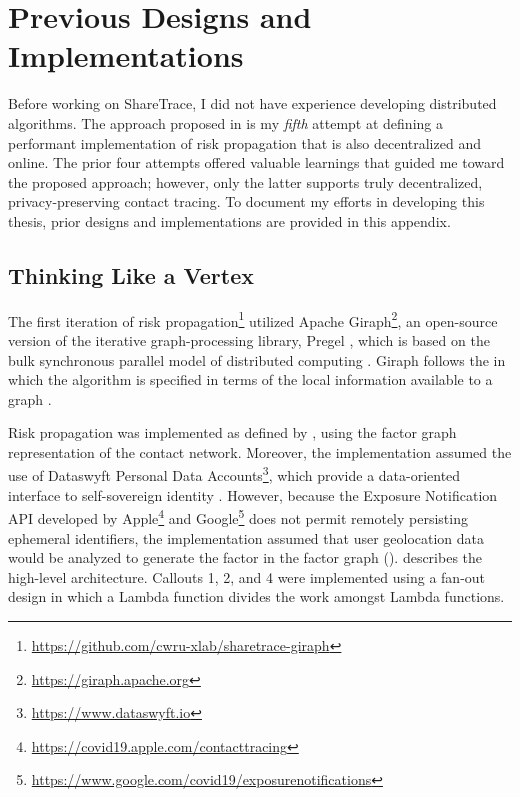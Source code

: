 \chapter{Previous Designs and Implementations}\label{sec:previous-designs}


Before working on ShareTrace, I did not have experience developing distributed algorithms. The approach proposed in  is my \emph{fifth} attempt at defining a performant implementation of risk propagation that is also decentralized and online. The prior four attempts offered valuable learnings that guided me toward the proposed approach; however, only the latter supports truly decentralized, privacy-preserving contact tracing. To document my efforts in developing this thesis, prior designs and implementations are provided in this appendix.

\section{Thinking Like a Vertex}\label{sec:giraph}

The first iteration of risk propagation\footnote{\url{https://github.com/cwru-xlab/sharetrace-giraph}} utilized Apache Giraph\footnote{\url{https://giraph.apache.org}}, an open-source version of the iterative graph-processing library, Pregel \citep{Malewicz2010}, which is based on the bulk synchronous parallel model of distributed computing \citep{Valiant1990}. Giraph follows the  in which the algorithm is specified in terms of the local information available to a graph \vertexName{} \citep{McCune2015}.

Risk propagation was implemented as defined by \citet{Ayday2020,Ayday2021}, using the factor graph representation of the contact network. Moreover, the implementation assumed the use of Dataswyft Personal Data Accounts\footnote{\url{https://www.dataswyft.io}}, which provide a data-oriented interface to self-sovereign identity \citep[pp. 98--99]{Preukschat2021}. However, because the Exposure Notification API developed by Apple\footnote{\url{https://covid19.apple.com/contacttracing}} and Google\footnote{\url{https://www.google.com/covid19/exposurenotifications}} does not permit remotely persisting ephemeral identifiers, the implementation assumed that user geolocation data would be analyzed to generate the factor \verticesName{} in the factor graph ().  describes the high-level architecture. Callouts 1, 2, and 4 were implemented using a fan-out design in which a  Lambda function divides the work amongst  Lambda functions.


